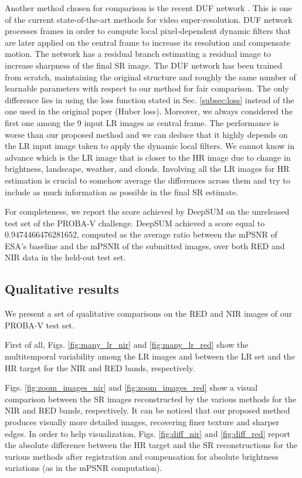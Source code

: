\documentclass[journal]{IEEEtran}
\begin{document}
Another method chosen for comparison is the recent DUF network \cite{Jo_2018_CVPR}. This is one of the current state-of-the-art methods for video super-resolution. DUF network processes  frames in order to compute local pixel-dependent dynamic filters that are later applied on the central frame to increase its resolution and compensate motion. The network has a residual branch estimating a residual image to increase sharpness of the final SR image.
The DUF network has been trained from scratch, maintaining the original structure and roughly the same number of learnable parameters with respect to our method for fair comparison. The only difference lies in using the loss function stated in Sec. \ref{subsec:loss} instead of the one used in the original paper (Huber loss).
Moreover, we always considered the first one among the 9 input LR images as central frame.
The performance is worse than our proposed method and we can deduce that it highly depends on the LR input image taken to apply the dynamic local filters. We cannot know in advance which is the LR image that is closer to the HR image due to change in brightness, landscape, weather, and clouds. Involving all the LR images for HR estimation is crucial to somehow average the differences across them and try to include as much information as possible in the final SR estimate.

For completeness, we report the score achieved by DeepSUM on the unreleased test set of the PROBA-V challenge. DeepSUM achieved a score equal to 0.9474466476281652, computed as the average ratio between the mPSNR of ESA's baseline and the mPSNR of the submitted images, over both RED and NIR data in the held-out test set.  


\subsection{Qualitative results}
We present a set of qualitative comparisons on the RED and NIR images of our PROBA-V test set. 

First of all, Figs. \ref{fig:many_lr_nir} and \ref{fig:many_lr_red} show the multitemporal variability among the LR images and between the LR set and the HR target for the NIR and RED bands, respectively.

Figs. \ref{fig:zoom_images_nir} and \ref{fig:zoom_images_red} show a visual comparison between the SR images reconstructed by the various methods for the NIR and RED bands, respectively. It can be noticed that our proposed method produces visually more detailed images, recovering finer texture and sharper edges. In order to help visualization, Figs. \ref{fig:diff_nir} and \ref{fig:diff_red} report the absolute difference between the HR target and the SR reconstructions for the various methods after registration and compensation for absolute brightness variations (as in the mPSNR computation).
\end{document}
